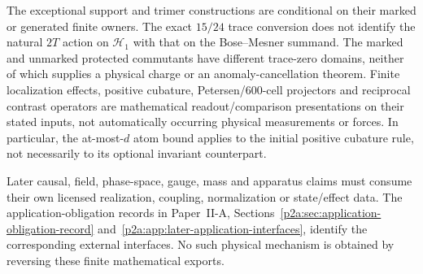 \documentclass[12pt,a4paper]{article}
\begin{document}
The exceptional support and trimer constructions are conditional on their
marked or generated finite owners.  The exact $15/24$ trace conversion
does not identify the natural $2T$ action on $\mathcal H_1$ with that on
the Bose--Mesner summand.  The marked and unmarked protected commutants
have different trace-zero domains, neither of which supplies a physical
charge or an anomaly-cancellation theorem.  Finite localization effects,
positive cubature, Petersen/600-cell projectors and reciprocal contrast
operators are mathematical readout/comparison presentations on their
stated inputs, not automatically occurring physical measurements or
forces.  In particular, the at-most-$d$ atom bound applies to the
initial positive cubature rule, not necessarily to its optional invariant
counterpart.

Later causal, field, phase-space, gauge, mass and apparatus claims must
consume their own licensed realization, coupling, normalization or
state/effect data.  The application-obligation records in Paper~II-A,
Sections~\ref{p2a:sec:application-obligation-record}
and~\ref{p2a:app:later-application-interfaces}, identify the
corresponding external interfaces.  No such physical mechanism is
obtained by reversing these finite mathematical exports.

\printbibliography
\end{document}
